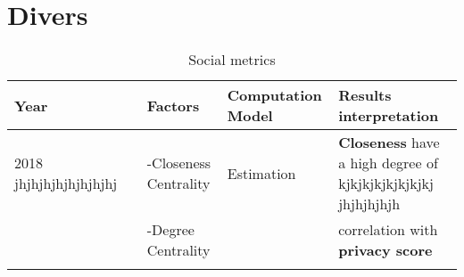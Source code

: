 \section{Divers}

\onecolumn
\pagestyle{empty}
\setlength{\hoffset}{-0.5in}

\begin{longtable}{lllll}
	\textbf{Year}  &                                                & \textbf{Factors}                 & \textbf{Computation Model}       & \textbf{Results interpretation}                               \\\hline
	2018  jhjhjhjhjhjhjhjhj		   & \cite{alemany_estimation_2018}                 & -Closeness Centrality            & Estimation                       & \textbf{Closeness} have a high degree of   kjkjkjkjkjkjkjkj jhjhjhjhjh                   \\
	\    		   &                                                & -Degree Centrality               &                                  & correlation with \textbf{privacy score}                       \\\hline
\caption{Social metrics}
\end{longtable}

\setlength{\hoffset}{0in}


